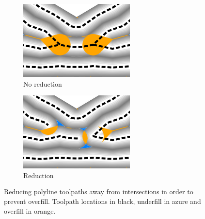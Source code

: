 \begin{figure}
\centering
\setlength{\figwidth}{.35\columnwidth}
\begin{subfigure}{0.45\columnwidth}\centering
\includegraphics[width=\figwidth,frame]{sources-method-polyline-reduction-before}
\caption{No reduction}
\end{subfigure}
\begin{subfigure}{0.45\columnwidth}\centering
\includegraphics[width=\figwidth,frame]{sources-method-polyline-reduction-after}
\caption{Reduction}
\end{subfigure}
\caption{
Reducing polyline toolpaths away from intersections in order to prevent overfill.
Toolpath locations in black, underfill in azure and overfill in orange.
}
\label{polyline_reduction}
\end{figure}




























































